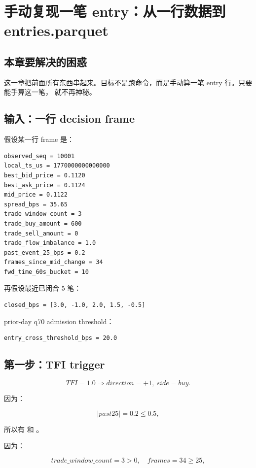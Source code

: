 \chapter{手动复现一笔 entry：从一行数据到 entries.parquet}

\section{本章要解决的困惑}

这一章把前面所有东西串起来。目标不是跑命令，而是手动算一笔 entry 行。只要能手算这一笔， 就不再神秘。

\section{输入：一行 decision frame}

假设某一行 frame 是：

\begin{lstlisting}
observed_seq = 10001
local_ts_us = 1770000000000000
best_bid_price = 0.1120
best_ask_price = 0.1124
mid_price = 0.1122
spread_bps = 35.65
trade_window_count = 3
trade_buy_amount = 600
trade_sell_amount = 0
trade_flow_imbalance = 1.0
past_event_25_bps = 0.2
frames_since_mid_change = 34
fwd_time_60s_bucket = 10
\end{lstlisting}

再假设最近已闭合 5 笔：

\begin{lstlisting}
closed_bps = [3.0, -1.0, 2.0, 1.5, -0.5]
\end{lstlisting}

prior-day q70 admission threshold：

\begin{lstlisting}
entry_cross_threshold_bps = 20.0
\end{lstlisting}

\section{第一步：TFI trigger}

\[
TFI=1.0 \Rightarrow direction=+1,\ side=buy.
\]

因为：

\[
|past25|=0.2 \le 0.5,
\]

所以有  和 。

因为：

\[
trade\_window\_count=3>0,\quad frames=34\ge25,
\]

